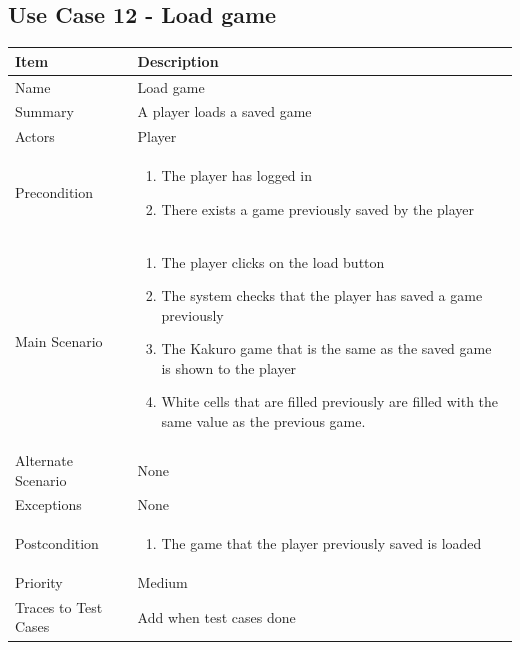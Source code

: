\documentclass[12pt]{article}
\begin{document}
\newpage


\subsection{Use Case 12 - Load game}

\begin{center}
\setlength{\tabcolsep}{18pt}
\renewcommand{\arraystretch}{1.3}
\begin{tabular}{ |p{3.4cm}|p{10cm}| }
    \hline
   \textbf{Item} & \textbf{Description} \\
    \hline
    Name & Load game \\
    \hline
    Summary & A player loads a saved game \\
    \hline
    Actors & Player \\
    \hline
    Precondition & 
    \vspace*{-0.1in}
    \begin{enumerate}[leftmargin=0.2in]
        \item The player has logged in
        \item There exists a game previously saved by the player
    \end{enumerate}  \\
    \hline
    Main Scenario & 
    \vspace*{-0.1in}
    \begin{enumerate}[leftmargin=0.2in]
    \item The player clicks on the load button 
    \item The system checks that the player has saved a game previously
    \item The Kakuro game that is the same as the saved game is shown to the player
    \item White cells that are filled previously are filled with the same value as the previous game. 
    \end{enumerate}  \\
     \hline
    Alternate Scenario & None  \\
    \hline
    Exceptions & None \\
    \hline
    Postcondition & 
    \vspace*{-0.1in}
    \begin{enumerate}[leftmargin=0.2in]
        \item The game that the player previously saved is loaded
    \end{enumerate} \\
    \hline
    Priority & Medium \\
    \hline
    Traces to Test Cases & Add when test cases done  \\
    \hline
\end{tabular}
\end{center}
\end{document}
